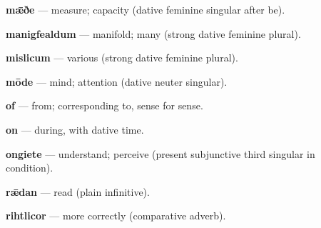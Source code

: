 \textbf{mǣðe} — measure; capacity (dative feminine singular after be).

\textbf{manigfealdum} — manifold; many (strong dative feminine plural).

\textbf{mislicum} — various (strong dative feminine plural).

\textbf{mōde} — mind; attention (dative neuter singular).

\textbf{of} — from; corresponding to, sense for sense.

\textbf{on} — during, with dative time.

\textbf{ongiete} — understand; perceive (present subjunctive third singular in condition).

\textbf{rǣdan} — read (plain infinitive).

\textbf{rihtlicor} — more correctly (comparative adverb).

